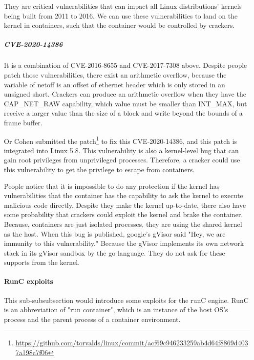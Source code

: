 They are critical vulnerabilities that can impact all Linux distributions' kernels being
built from 2011 to 2016. We can use these vulnerabilities to land on the kernel in
containers, such that the container would be controlled by crackers.

\subparagraph{CVE-2020-14386} It is a combination of CVE-2016-8655 and CVE-2017-7308 above.
Despite people patch those vulnerabilities, there exist an arithmetic overflow, because
the variable of netoff is an offset of ethernet header which is only stored in an unsigned
short. Crackers can produce an arithmetic overflow when they have the CAP\_NET\_RAW capability,
which value must be smaller than INT\_MAX, but receive a larger value than the size of a
block and write beyond the bounds of a frame buffer. %

Or Cohen submitted the patch\footnote{\url{https://github.com/torvalds/linux/commit/acf69c946233259ab4d64f8869d4037a198c7f06}}
to fix this CVE-2020-14386, and this patch is integrated into Linux 5.8. This vulnerability
is also a kernel-level bug that can gain root privileges from unprivileged processes.
Therefore, a cracker could use this vulnerability to get the privilege to escape from containers.

People notice that it is impossible to do any protection if the kernel has vulnerabilities
that the container has the capability to ask the kernel to execute malicious code directly. Despite
they make the kernel up-to-date, there also have some probability that crackers could exploit
the kernel and brake the container. Because, containers are just isolated processes, they
are using the shared kernel as the host. When this bug is published, google's gVisor said
"Hey, we are immunity to this vulnerability." %
Because the gVisor implements its own network stack in its gVisor sandbox by the go language.
They do not ask for these supports from the kernel.

\paragraph{RunC exploits}

This sub-subsubsection would introduce some exploits for the runC engine.
RunC is an abbreviation of "run container", which is an instance of the host OS's process and the
parent process of a container environment.

